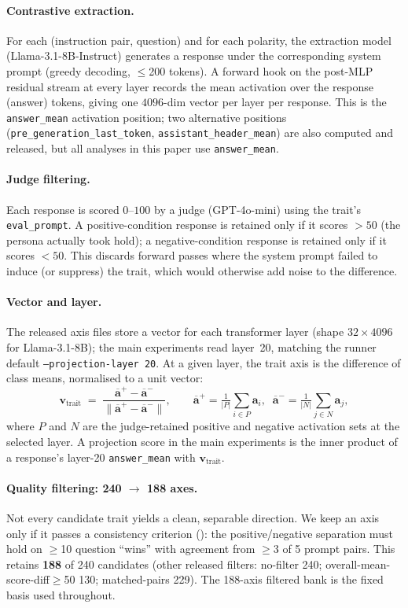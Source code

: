 \documentclass{article}
\newcommand{\ax}[1]{\texttt{#1}}   %
\begin{document}
\paragraph{Contrastive extraction.} For each (instruction pair, question) and for each polarity, the extraction model (\mbox{Llama-3.1-8B-Instruct}) generates a response under the corresponding system prompt (greedy decoding, $\leq$200 tokens). A forward hook on the post-MLP residual stream at every layer records the mean activation over the response (answer) tokens, giving one $4096$-dim vector per layer per response. This is the \ax{answer\_mean} activation position; two alternative positions (\ax{pre\_generation\_last\_token}, \ax{assistant\_header\_mean}) are also computed and released, but all analyses in this paper use \ax{answer\_mean}.

\paragraph{Judge filtering.} Each response is scored $0$--$100$ by a judge (GPT-4o-mini) using the trait's \texttt{eval\_prompt}. A positive-condition response is retained only if it scores $>50$ (the persona actually took hold); a negative-condition response is retained only if it scores $<50$. This discards forward passes where the system prompt failed to induce (or suppress) the trait, which would otherwise add noise to the difference.

\paragraph{Vector and layer.} The released axis files store a vector for each transformer layer (shape $32\times4096$ for \mbox{Llama-3.1-8B}); the main experiments read layer~20, matching the runner default \texttt{--projection-layer 20}. At a given layer, the trait axis is the difference of class means, normalised to a unit vector:
\[
\mathbf{v}_{\text{trait}} \;=\; \frac{\overline{\mathbf{a}}^{+} - \overline{\mathbf{a}}^{-}}{\lVert \overline{\mathbf{a}}^{+} - \overline{\mathbf{a}}^{-}\rVert},
\qquad
\overline{\mathbf{a}}^{+} = \tfrac{1}{|P|}\!\sum_{i\in P}\mathbf{a}_i,\;\;
\overline{\mathbf{a}}^{-} = \tfrac{1}{|N|}\!\sum_{j\in N}\mathbf{a}_j,
\]
where $P$ and $N$ are the judge-retained positive and negative activation sets at the selected layer. A projection score in the main experiments is the inner product of a response's layer-20 \ax{answer\_mean} with $\mathbf{v}_{\text{trait}}$.

\paragraph{Quality filtering: 240 $\rightarrow$ 188 axes.} Not every candidate trait yields a clean, separable direction. We keep an axis only if it passes a consistency criterion (): the positive/negative separation must hold on $\geq$10 question ``wins'' with agreement from $\geq$3 of 5 prompt pairs. This retains \textbf{188} of 240 candidates (other released filters: no-filter 240; overall-mean-score-diff$\ge$50 130; matched-pairs 229). The 188-axis filtered bank is the fixed basis used throughout.
\end{document}
